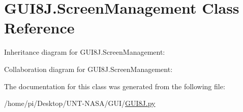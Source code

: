 \hypertarget{classGUI8J_1_1ScreenManagement}{}\section{G\+U\+I8\+J.\+Screen\+Management Class Reference}
\label{classGUI8J_1_1ScreenManagement}


Inheritance diagram for G\+U\+I8\+J.\+Screen\+Management\+:


Collaboration diagram for G\+U\+I8\+J.\+Screen\+Management\+:


The documentation for this class was generated from the following file\+:\begin{DoxyCompactItemize}
\item 
/home/pi/\+Desktop/\+U\+N\+T-\/\+N\+A\+S\+A/\+G\+U\+I/\hyperlink{GUI8J_8py}{G\+U\+I8\+J.\+py}\end{DoxyCompactItemize}
